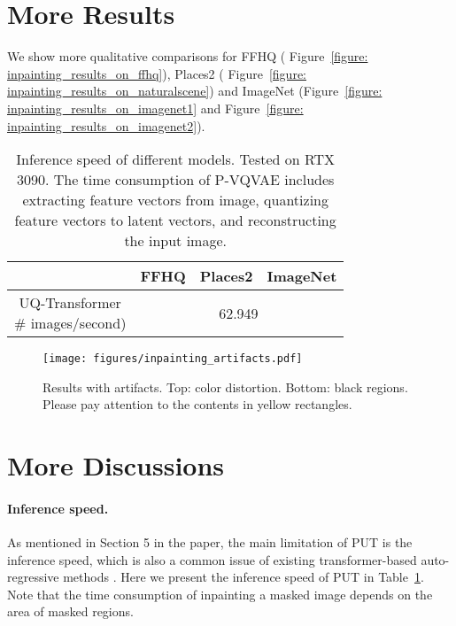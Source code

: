 \documentclass[10pt,twocolumn,letterpaper]{article}
\newcommand{\Tref}[1]{Table~\ref{#1}}
\newcommand{\Fref}[1]{Figure~\ref{#1}}
\begin{document}
\section{More Results}
\label{sec: more_results}
\label{sec: image_inainting_results}
We show more qualitative comparisons for FFHQ \cite{karras2019style} ( \Fref{figure: inpainting_results_on_ffhq}), Places2 \cite{zhou2017places} ( \Fref{figure: inpainting_results_on_naturalscene}) and ImageNet \cite{deng2009imagenet} (\Fref{figure: inpainting_results_on_imagenet1} and \Fref{figure: inpainting_results_on_imagenet2}). 



\begin{table}
	\setlength{\tabcolsep}{6pt}
\footnotesize
\centering
		\begin{tabular}{c|c|c|c}
			\hline
			\diagbox{Models}{Datasets} & FFHQ \cite{karras2019style} & Places2  \cite{zhou2017places} & ImageNet \cite{deng2009imagenet}  \\
			\hline 
			\makecell[c]{UQ-Transformer\\# images/second)}  &\multicolumn{3}{c}{62.949}  \\
			\hline
		\end{tabular}
	\caption{Inference speed of different models. Tested on RTX 3090. The time consumption of P-VQVAE includes extracting feature vectors from image, quantizing feature vectors to latent vectors, and reconstructing the input image.} 
	\label{tab: inference_speed}
\end{table}	


\begin{figure}[h]
	\centering
	\texttt{[image: figures/inpainting\_artifacts.pdf]} 
	\caption{Results with artifacts. Top: color distortion. Bottom: black regions. Please pay attention to the contents in yellow rectangles.}
	\label{figure: inpainting_artifacts}
\end{figure}




\section{More Discussions}
\label{sec: discussion}

\paragraph{Inference speed.} 
As mentioned in Section 5 in the paper, the main limitation of PUT is the inference speed, which is also a common issue of existing transformer-based auto-regressive methods \cite{vaswani2017attention, wan2021high, ramesh2021zero, esser2021taming}. Here we present the inference speed of PUT in \Tref{tab: inference_speed}. Note that the time consumption of inpainting a masked image depends on the area of masked regions.
\end{document}
